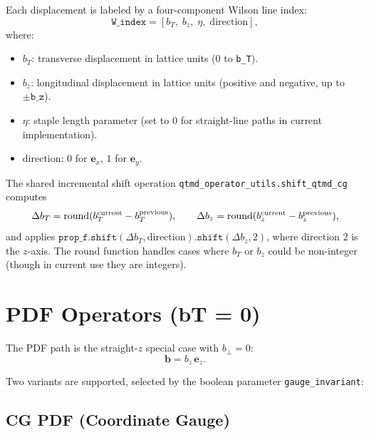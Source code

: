 \documentclass[11pt,a4paper]{article}
\begin{document}
Each displacement is labeled by a four-component Wilson line index:
\begin{equation}
  \texttt{W\_index} = [b_T,\; b_z,\; \eta,\; \text{direction}],
\end{equation}
where:
\begin{itemize}[nosep]
  \item $b_T$: transverse displacement in lattice units ($0$ to
        \texttt{b\_T}).
  \item $b_z$: longitudinal displacement in lattice units (positive and
        negative, up to $\pm\texttt{b\_z}$).
  \item $\eta$: staple length parameter (set to 0 for straight-line paths in
        current implementation).
  \item $\text{direction}$: $0$ for $\mathbf{e}_x$, $1$ for
        $\mathbf{e}_y$.
\end{itemize}

The shared incremental shift operation
\verb|qtmd_operator_utils.shift_qtmd_cg| computes
\begin{equation}
  \Delta b_T = \text{round}(b_T^{\rm current} - b_T^{\rm previous}),\qquad
  \Delta b_z = \text{round}(b_z^{\rm current} - b_z^{\rm previous}),
\end{equation}
and applies $\texttt{prop\_f.shift}(\Delta b_T,
\text{direction}).\texttt{shift}(\Delta b_z, 2)$, where direction 2 is the
$z$-axis.  The $\text{round}$ function handles cases where $b_T$ or $b_z$ could
be non-integer (though in current use they are integers).

\section{PDF Operators (bT = 0)}
\label{sec:pdf}

The PDF path is the straight-$z$ special case with $b_\perp = 0$:
\begin{equation}
  \mathbf{b} = b_z\,\mathbf{e}_z.
\end{equation}

Two variants are supported, selected by the boolean parameter
\texttt{gauge\_invariant}:

\subsection{CG PDF (Coordinate Gauge)}
\end{document}
